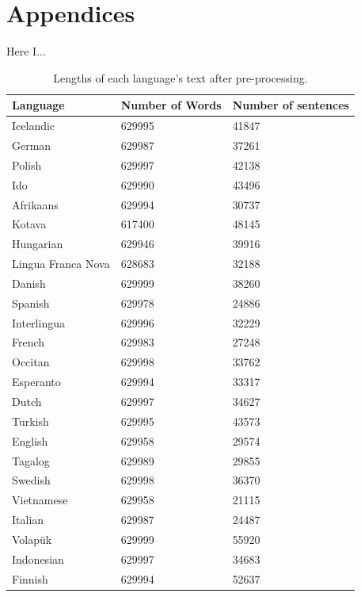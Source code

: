 \documentclass[12pt,a4paper]{article}
\numberwithin{figure}{section}
\numberwithin{table}{section}
\numberwithin{definition}{section}
\begin{document}
\newpage
\printbibliography

\newpage
\section{Appendices}
\label{sec:appendices}

Here I...

\begin{table}[h!]
  \centering
  \renewcommand{\arraystretch}{1.5}
  \begin{tabular} {|p{3cm}|p{3cm}|p{3.5cm}|}
  \hline
  \textbf{Language} & \textbf{Number of Words} & \textbf{Number of sentences} \\
  \hline
  Icelandic & 629995 & 41847 \\
  German & 629987 & 37261 \\
  Polish & 629997 & 42138 \\
  Ido & 629990 & 43496 \\
  Afrikaans & 629994 & 30737 \\
  Kotava & 617400 & 48145 \\
  Hungarian & 629946 & 39916 \\
  Lingua Franca Nova & 628683 & 32188 \\
  Danish & 629999 & 38260 \\
  Spanish & 629978 & 24886 \\
  Interlingua & 629996 & 32229 \\
  French & 629983 & 27248 \\
  Occitan & 629998 & 33762 \\
  Esperanto & 629994 & 33317 \\
  Dutch & 629997 & 34627 \\
  Turkish & 629995 & 43573 \\
  English & 629958 & 29574 \\
  Tagalog & 629989 & 29855 \\
  Swedish & 629998 & 36370 \\
  Vietnamese & 629958 & 21115 \\
  Italian & 629987 & 24487 \\
  Volapük & 629999 & 55920 \\
  Indonesian & 629997 & 34683 \\
  Finnish & 629994 & 52637 \\
  \hline
  \end{tabular}
\caption{Lengths of each language's text after pre-processing.}
\label{tbl:preprocessedtexts}
\end{table}


\end{document}
